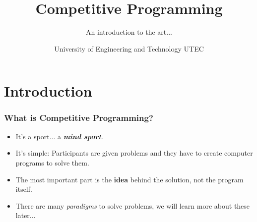 \documentclass{beamer}
\begin{document}
\title{Competitive Programming}
\subtitle{An introduction to the art...}
\author{University of Engineering and Technology UTEC}

\maketitle

\section{Introduction}

\begin{frame}
	\frametitle{What is Competitive Programming?}

	\begin{itemize}
		\item It's a sport... a \textbf{\textit{mind sport}}.
		\item It's simple: Participants are given problems and they have to create computer programs to solve them.
		\item The most important part is the \textbf{idea} behind the solution, not the program itself.
		\item There are many \textit{paradigms} to solve problems, we will learn more about these later...
	\end{itemize}
\end{frame}
\end{document}
